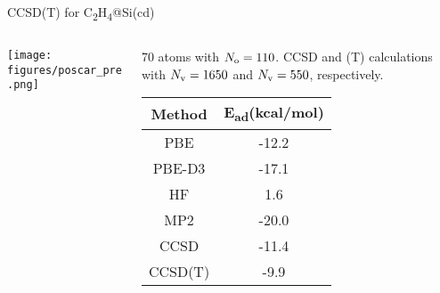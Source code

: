 \begin{block}{\large CCSD(T) for C\textsubscript{2}H\textsubscript{4}@Si(cd)}

  \begin{columns}
    \begin{column}{.49\linewidth}
      \texttt{[image: figures/poscar\_pre.png]}
    \end{column}
    \begin{column}{.49\linewidth}
      70 atoms with $N_{\rm o}=110$. CCSD and (T) calculations
      with $N_{\rm v}=1650$ and $N_{\rm v}=550$, respectively\cite{tonner}. \\
        \begin{tabular}{ c|c } 
      Method & E\textsubscript{ad}(kcal/mol)\\
        \hline
        PBE & -12.2  \\ 
        PBE-D3 & -17.1  \\ 
        HF & 1.6 \\
        MP2 & -20.0 \\
        CCSD & -11.4 \\
        CCSD(T) & -9.9
        \end{tabular}
    \end{column}
  \end{columns}
\end{block}
